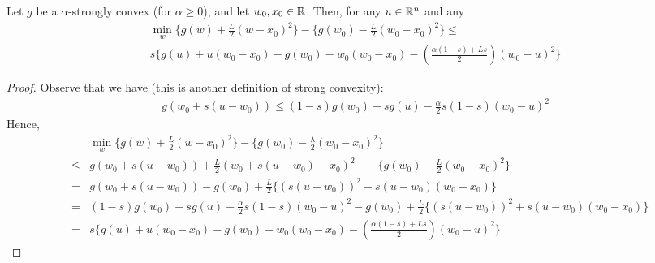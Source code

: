\begin{lemma}
Let $g$ be a $\alpha$-strongly convex (for $\alpha \ge 0$), and let $w_0,x_0 \in \mathbb{R}$. Then, for any $u \in \mathbb{R}^n$ and any 
\begin{multline}
\min_{w} \{g(w) + \frac{L}{2}(w - x_0 )^2\} - \{g(w_0) - \frac{L}{2}(w_0 - x_0)^2\} \le \\
s\{g(u) + u(w_0 - x_0) - g(w_0) - w_0(w_0 - x_0)  - (\frac{\alpha(1-s) + L s}{2})(w_0 - u)^2\}
\end{multline}
\end{lemma}
\begin{proof} Observe that we have (this is another definition of strong convexity):
\begin{eqnarray}
g(w_0 + s(u - w_0)) \le (1-s)g(w_0) + sg(u) - \frac{\alpha}{2}s(1-s)(w_0 - u)^2
\end{eqnarray}
Hence, 
\begin{eqnarray}
&& \min_{w} \{g(w) + \frac{L}{2}(w - x_0)^2\} - \{g(w_0) - \frac{\lambda}{2}(w_0 - x_0)^2\} \\
&\le& g(w_0 + s(u - w_0)) + \frac{L}{2}(w_0 + s(u - w_0) - x_0)^2 - - \{g(w_0) - \frac{L}{2}(w_0 - x_0)^2\}\\
&=& g(w_0 + s(u - w_0)) - g(w_0) + \frac{L}{2} \{(s(u-w_0))^2 + s(u-w_0)(w_0 - x_0)\}\\
&=& (1-s)g(w_0) + sg(u) - \frac{\alpha}{2}s(1-s)(w_0 - u)^2 - g(w_0) + \frac{L}{2} \{(s(u-w_0))^2 + s(u-w_0)(w_0 - x_0)\}\\
&=& s\{g(u) + u(w_0 - x_0) - g(w_0) - w_0(w_0 - x_0)  - (\frac{\alpha(1-s) + L s}{2})(w_0 - u)^2\}
\end{eqnarray}



\end{proof}

\begin{theorem}[SCDA] 
\end{theorem}
